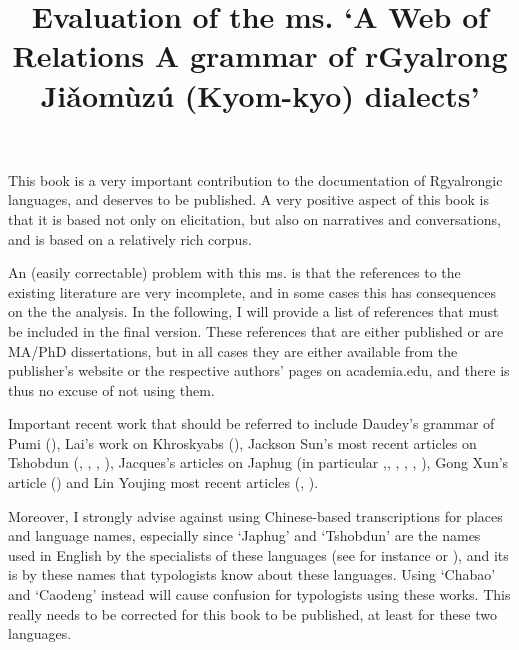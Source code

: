 \documentclass[oldfontcommands,oneside,a4paper,11pt]{article}
\begin{document}
 
\title{Evaluation of the ms. `A Web of Relations A grammar of rGyalrong Jiǎomùzú (Kyom-kyo) dialects'} 
\maketitle 

 This book is a very important contribution to the documentation of Rgyalrongic languages, and deserves to be published. A very positive aspect of this book is that it is based not only on elicitation, but also on narratives and conversations, and is based on a relatively rich corpus. 

An (easily correctable) problem with this ms. is that the references to the existing literature are very incomplete, and in some cases this has consequences on the the analysis. In the following, I will provide a list of references that must be included in the final version. These references that are either published or are MA/PhD dissertations, but in all cases they are either available from the publisher's website or the respective authors' pages on academia.edu, and there is thus no excuse of not using them.

Important recent work that should be referred to include Daudey's grammar of Pumi (\citealt{daudey14grammar}), Lai's work on Khroskyabs (\citealt{lai13affixale}), Jackson Sun's most recent articles on Tshobdun (\citet{sun12complementation}, \citet{sun14generic}, \citet{jackson07irrealis}, \citet{jackson14morpho}), Jacques's articles on Japhug (in particular \citet{jacques13tropative},\citet{jacques12incorp}, \citet{jacques13harmonization}, \citet{japhug14ideophones}, \citet{jacques14linking}, \citet{jacques14antipassive}), Gong Xun's article (\citealt{gongxun14agreement}) and Lin Youjing most recent articles (\citealt{lin11direction},  \citealt{linyj12tone}).

Moreover, I strongly advise against using Chinese-based transcriptions for places and language names, especially since `Japhug' and `Tshobdun' are the names used in English by the specialists of these languages (see for instance \citealt{jackson14morpho} or \citealt{jacques13harmonization}), and its is by these names that typologists know about these languages. Using `Chabao' and `Caodeng' instead will cause confusion for typologists using these works. This really needs to be corrected for this book to be published, at least for these two languages.
\end{document}
